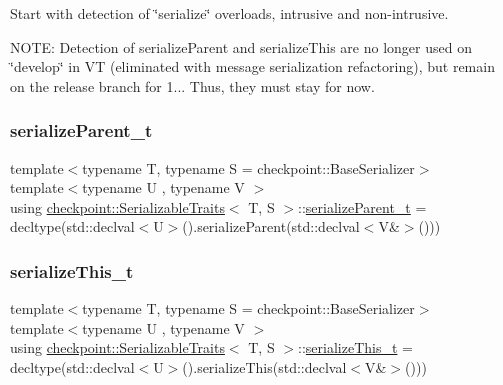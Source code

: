 Start with detection of \char`\"{}serialize\char`\"{} overloads, intrusive and non-\/intrusive.

N\+O\+TE\+: Detection of {\ttfamily serialize\+Parent} and {\ttfamily serialize\+This} are no longer used on \char`\"{}develop\char`\"{} in VT (eliminated with message serialization refactoring), but remain on the release branch for 1... Thus, they must stay for now. \mbox{\label{structcheckpoint_1_1_serializable_traits_a38585e5b9aa0653c08ff48504e922ad5}} 
\subsubsection{\texorpdfstring{serialize\+Parent\+\_\+t}{serializeParent\_t}}
{\footnotesize\ttfamily template$<$typename T, typename S = checkpoint\+::\+Base\+Serializer$>$ \\
template$<$typename U , typename V $>$ \\
using \hyperlink{structcheckpoint_1_1_serializable_traits}{checkpoint\+::\+Serializable\+Traits}$<$ T, S $>$\+::\hyperlink{structcheckpoint_1_1_serializable_traits_a38585e5b9aa0653c08ff48504e922ad5}{serialize\+Parent\+\_\+t} =  decltype(std\+::declval$<$U$>$().serialize\+Parent(std\+::declval$<$V\&$>$()))}

\mbox{\label{structcheckpoint_1_1_serializable_traits_ac81eb64532a65d97dc995e582ef708ad}} 
\subsubsection{\texorpdfstring{serialize\+This\+\_\+t}{serializeThis\_t}}
{\footnotesize\ttfamily template$<$typename T, typename S = checkpoint\+::\+Base\+Serializer$>$ \\
template$<$typename U , typename V $>$ \\
using \hyperlink{structcheckpoint_1_1_serializable_traits}{checkpoint\+::\+Serializable\+Traits}$<$ T, S $>$\+::\hyperlink{structcheckpoint_1_1_serializable_traits_ac81eb64532a65d97dc995e582ef708ad}{serialize\+This\+\_\+t} =  decltype(std\+::declval$<$U$>$().serialize\+This(std\+::declval$<$V\&$>$()))}

